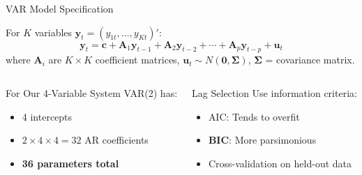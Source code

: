 \documentclass[9pt, aspectratio=169, t]{beamer}
\begin{document}
\begin{frame}{VAR Model Specification}
    \begin{defn}
        For $K$ variables $\mathbf{y}_t = (y_{1t}, \ldots, y_{Kt})'$:
        \begin{equation*}
            \mathbf{y}_t = \mathbf{c} + \mathbf{A}_1\mathbf{y}_{t-1} + \mathbf{A}_2\mathbf{y}_{t-2} + \cdots + \mathbf{A}_p\mathbf{y}_{t-p} + \mathbf{u}_t
        \end{equation*}
        where $\mathbf{A}_i$ are $K \times K$ coefficient matrices, $\mathbf{u}_t \sim N(\mathbf{0}, \boldsymbol{\Sigma})$, $\boldsymbol{\Sigma}$ = covariance matrix.
    \end{defn}

    \vspace{0.3cm}

    \begin{columns}[T]
        \begin{block}{For Our 4-Variable System}
            VAR(2) has:
            \begin{itemize}\setlength{\itemsep}{0pt}
                \item 4 intercepts
                \item $2 \times 4 \times 4 = 32$ AR coefficients
                \item \textbf{36 parameters total}
            \end{itemize}
        \end{block}

        \begin{exampleblock}{Lag Selection}
            Use information criteria:
            \begin{itemize}\setlength{\itemsep}{0pt}
                \item AIC: Tends to overfit
                \item \textbf{BIC}: More parsimonious
                \item Cross-validation on held-out data
            \end{itemize}
        \end{exampleblock}
    \end{columns}
\end{frame}
\end{document}
